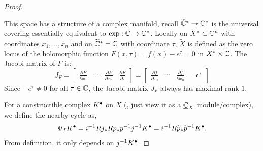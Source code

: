 \begin{proof}
\begin{enumerate}
              This space has a structure of a complex manifold, recall $\widetilde{\mathbb{C}}^* \to \mathbb{C}^*$ is the universal covering essentially equivalent to $\exp: \mathbb{C} \to \mathbb{C}^*$.
              Locally on $X^* \subset \mathbb{C}^n$ with coordinates $x_1, \dots, x_n$ and on $\widetilde{\mathbb{C}}^* = \mathbb{C}$ with coordinate $\tau$, $\widetilde{X}$ is defined as the zero locus of the holomorphic function
              $F(x, \tau) = f(x) - e^\tau = 0$ in $X^* \times \mathbb{C}$.
              The Jacobi matrix of $F$ is:
              \[
                  J_F = \begin{bmatrix} \frac{\partial F}{\partial x_1} & \cdots & \frac{\partial F}{\partial x_n} & \frac{\partial F}{\partial \tau} \end{bmatrix}
                  = \begin{bmatrix} \frac{\partial f}{\partial x_1} & \cdots & \frac{\partial f}{\partial x_n} & -e^\tau \end{bmatrix}
              \]
              Since $-e^\tau \neq 0$ for all $\tau \in \mathbb{C}$, the Jacobi matrix $J_F$ always has maximal rank $1$.
    \end{enumerate}
    For a constructible complex ${K^\bullet}$ on $X$ (\cite[Definition~4.5.3.]{hotta2008d}, just view it as a $\underline{\mathbb{C}}_X$ module/complex),
    we define the nearby cycle as,
    \[
        \Psi_f{K^\bullet} = i^{-1}Rj_*Rp_*p^{-1}j^{-1}{K^\bullet}=i^{-1}R\widetilde{p}_*\widetilde{p}^{-1}{K^\bullet}.
    \]
    From definition, it only depends on $j^{-1}{K^\bullet}$.


\end{proof}
